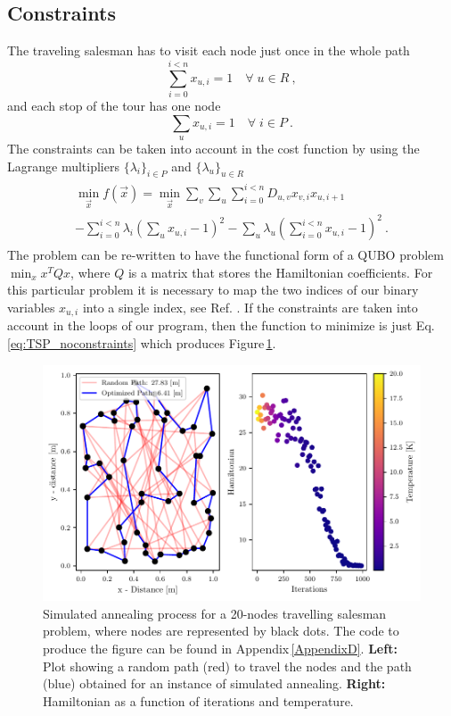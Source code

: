 \subsection{Constraints}
The traveling salesman has to visit each node just once in the whole path
\begin{equation}
    \sum_{i=0}^{i<n}x_{u,i} = 1 \quad  \forall \; u \in R\ ,
\end{equation}
and each stop of the tour has one node
\begin{equation}
    \sum_{u}x_{u, i} = 1 \quad  \forall \; i \in P\ .
\end{equation}
The constraints can be taken into account in the cost function by using the Lagrange multipliers $\{\lambda_{i}\}_{i \in P}$ and $\{\lambda_{u}\}_{u \in R}$
\begin{align}
        \label{eq: ObjectiveMatrixFunction}
    \begin{split}
   \min_{\vec{x}} f(\vec{x}) = \min_{\vec{x}} \sum_{v} \sum_{u} \sum_{i=0}^{i<n}D_{u,v}x_{v,i}x_{u, i+1}\\
   - \sum_{i=0}^{i<n}\lambda_{i}\left(\sum_{u} x_{u, i} - 1\right)^{2} - \sum_{u}\lambda_{u} \left( \sum_{i=0}^{i<n}x_{u,i} - 1\right)^{2}\ .
\end{split}
\end{align}
The problem can be re-written to have the functional form of a QUBO problem $\min_{x}x^{T}Qx$, where $Q$ is a matrix that stores the Hamiltonian coefficients. For this particular problem it is necessary to map the two indices of our binary variables $x_{u,i}$ into a single index, see Ref. \cite{Jain2021SolvingComputer}.
If the constraints are taken into account in the loops of our program, then the function to minimize is just Eq.\,\eqref{eq:TSP_noconstraints} which produces Figure\,\ref{fig:TSP_SA}.
\begin{figure}[H]
    \centering
    \includegraphics[width=\textwidth]{Figures/TSP_SA.pdf}
    \caption{Simulated annealing process for a 20-nodes travelling salesman problem, where nodes are represented by black dots. The code to produce the figure can be found in Appendix\,\ref{AppendixD}.\textbf{ Left:} Plot showing a random path (red) to travel the nodes and the path (blue) obtained for an instance of simulated annealing. \textbf{Right:} Hamiltonian as a function of iterations and temperature.}
    \label{fig:TSP_SA}
\end{figure}

